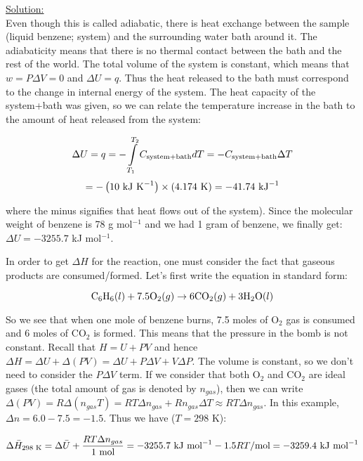 \noindent
\underline{Solution:}\\

Even though this is called adiabatic, there is heat exchange between the sample (liquid benzene; system) and the surrounding water bath around it. The adiabaticity means that there is no thermal contact between the bath and the rest of the world. The total volume of the system is constant, which means that $w = P\Delta V = 0$ and $\Delta U = q$. Thus the heat released to the bath must correspond to the change in internal energy of the system. The heat capacity of the system+bath was given, so we can relate the temperature increase in
the bath to the amount of heat released from the system:

$$\Delta U = q = -\int\limits_{T_1}^{T_2}C_{\textnormal{system+bath}}dT = -C_{\textnormal{system+bath}}\Delta T$$
$$ = -\left(10\textnormal{ kJ K}^{-1}\right)\times\left(4.174\textnormal{ K}\right) = -41.74\textnormal{ kJ}^{-1}$$

where the minus signifies that heat flows out of the system). Since the molecular weight of benzene is 78 g mol$^{-1}$ and we had 1 gram of benzene, we finally get: $\Delta U = -3255.7$ kJ mol$^{-1}$.

In order to get $\Delta H$ for the reaction, one must consider the fact that gaseous products are consumed/formed. Let's first write the equation in standard form:

$$\textnormal{C}_6\textnormal{H}_6(l) + 7.5\textnormal{O}_2(g) \rightarrow 6\textnormal{CO}_2(g) + 3\textnormal{H}_2\textnormal{O}(l)$$

So we see that when one mole of benzene burns, 7.5 moles of O$_2$ gas is consumed and 6 moles of CO$_2$ is formed. This means that the pressure in the bomb is not constant. Recall that $H = U + PV$ and hence $\Delta H = \Delta U + \Delta (PV) = \Delta U + P\Delta V + V\Delta P$. The volume is constant, so we don't need to consider the $P\Delta V$ term. If we consider that both O$_2$ and CO$_2$ are ideal gases (the total amount of gas is denoted by $n_{gas}$), then we can write $\Delta (PV) = R\Delta (n_{gas}T) = RT\Delta n_{gas} + Rn_{gas}\Delta T \approx RT\Delta n_{gas}$. In this example, $\Delta n = 6.0 - 7.5 = -1.5$. Thus we have ($T = 298$ K):

$$\Delta \bar{H}_{298\textnormal{ K}} = \Delta \bar{U} + \frac{RT\Delta n_{gas}}{1\textnormal{ mol}} = -3255.7\textnormal{ kJ mol}^{-1} - 1.5RT/\textnormal{mol} = -3259.4\textnormal{ kJ mol}^{-1}$$

